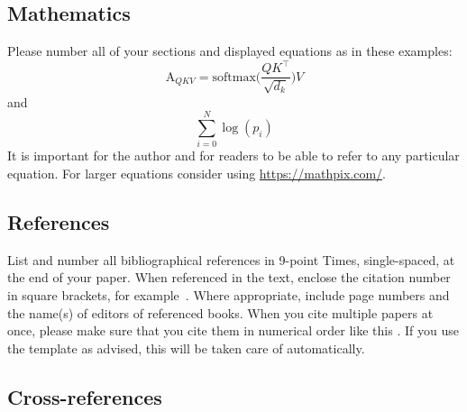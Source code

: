 {%
\subsection{Mathematics}

Please number all of your sections and displayed equations as in these examples:
\begin{equation}
  \text{A}_{QKV} = \text{softmax}\Big( \frac{QK^{\top}}{\sqrt{d_k}} \Big) V
  \label{eq:important}
\end{equation}
and
\begin{equation}
  \sum_{i=0}^N \log{(p_i)}
  \label{eq:also-important}
\end{equation}
It is important for the author and for readers to be able to refer to any particular equation. For larger equations consider using \url{https://mathpix.com/}.


\subsection{References}



List and number all bibliographical references in 9-point Times, single-spaced, at the end of your paper.
When referenced in the text, enclose the citation number in square brackets, for
example~\cite{Authors14}.
Where appropriate, include page numbers and the name(s) of editors of referenced books.
When you cite multiple papers at once, please make sure that you cite them in numerical order like this \cite{Alpher02,Alpher03,Alpher05,Authors14b,Authors14}.
If you use the template as advised, this will be taken care of automatically.

\subsection{Cross-references}

}
